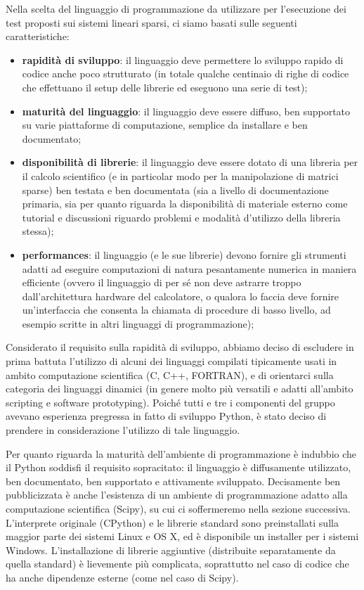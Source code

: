 \documentclass[11pt,a4paper]{scrartcl}
\begin{document}
Nella scelta del linguaggio di programmazione da utilizzare per l'esecuzione dei test proposti sui sistemi lineari sparsi, ci siamo basati sulle seguenti caratteristiche:
\begin{itemize}
	\item \textbf{rapidità di sviluppo}: il linguaggio deve permettere lo sviluppo rapido di codice anche poco strutturato (in totale qualche centinaio di righe di codice che effettuano il setup delle librerie ed eseguono una serie di test);
	\item \textbf{maturità del linguaggio}: il linguaggio deve essere diffuso, ben supportato su varie piattaforme di computazione, semplice da installare e ben documentato;
	\item \textbf{disponibilità di librerie}: il linguaggio deve essere dotato di una libreria per il calcolo scientifico (e in particolar modo per la manipolazione di matrici sparse) ben testata e ben documentata (sia a livello di documentazione primaria, sia per quanto riguarda la disponibilità di materiale esterno come tutorial e discussioni riguardo problemi e modalità d'utilizzo della libreria stessa);
	\item \textbf{performances}: il linguaggio (e le sue librerie) devono fornire gli strumenti adatti ad eseguire computazioni di natura pesantamente numerica in maniera efficiente (ovvero il linguaggio di per sé non deve astrarre troppo dall'architettura hardware del calcolatore, o qualora lo faccia deve fornire un'interfaccia che consenta la chiamata di procedure di basso livello, ad esempio scritte in altri linguaggi di programmazione);
\end{itemize}

Considerato il requisito sulla rapidità di sviluppo, abbiamo deciso di escludere in prima battuta l'utilizzo di alcuni dei linguaggi compilati tipicamente usati in ambito computazione scientifica (C, C++, FORTRAN), e di orientarci sulla categoria dei linguaggi dinamici (in genere molto più versatili e adatti all'ambito scripting e software prototyping). Poiché tutti e tre i componenti del gruppo avevano esperienza pregressa in fatto di sviluppo Python, è stato deciso di prendere in considerazione l'utilizzo di tale linguaggio.

Per quanto riguarda la maturità dell'ambiente di programmazione è indubbio che il Python soddisfi il requisito sopracitato: il linguaggio è diffusamente utilizzato, ben documentato, ben supportato e attivamente sviluppato. Decisamente ben pubblicizzata è anche l'esistenza di un ambiente di programmazione adatto alla computazione scientifica (Scipy), su cui ci soffermeremo nella sezione successiva. L'interprete originale (CPython) e le librerie standard sono preinstallati sulla maggior parte dei sistemi Linux e OS X, ed è disponibile un installer per i sistemi Windows. L'installazione di librerie aggiuntive (distribuite separatamente da quella standard) è lievemente più complicata, soprattutto nel caso di codice che ha anche dipendenze esterne (come nel caso di Scipy).
\end{document}
